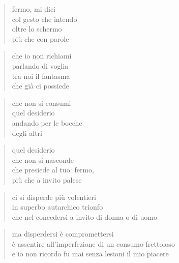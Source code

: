 \clearpage


\vspace*{2cm}

	\begin{verse}
		fermo, mi dici\\
		col gesto che intendo\\
		oltre lo schermo\\
		più che con parole
	\end{verse}

	\begin{verse}
		che io non richiami\\
		parlando di voglia\\
		tra noi il fantasma\\
		che già ci possiede
	\end{verse}

	\begin{verse}
		che non si consumi\\
		quel desiderio\\
		andando per le bocche\\
		degli altri
	\end{verse}

	\begin{verse}
		quel desiderio \\
		che non si nasconde\\
		che presiede al tuo: fermo,\\
		più che a invito palese
	\end{verse}

\clearpage


\vspace*{2cm}

	\begin{verse}
		ci si disperde più volentieri\\
		in superbo autarchico trionfo\\
		che nel concedersi a invito di donna o di uomo
	\end{verse}

	\begin{verse}
		ma disperdersi è compromettersi\\
		è assentire all'imperfezione di un consumo frettoloso\\
		e io non ricordo fu mai senza lesioni il mio piacere
	\end{verse}

\clearpage

